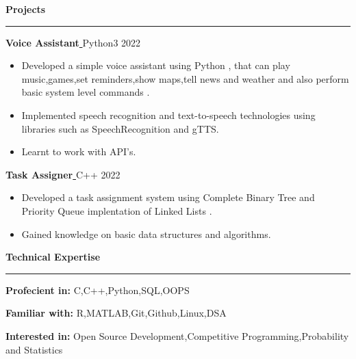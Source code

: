 \documentclass{article}
\begin{document}
\hypersetup{hidelinks,colorlinks,urlcolor=black} 
\vspace*{1cm}
\fontsize{15}{14}
\faLaptop\vspace*{0.1cm}\textbf{\Large{Projects}}\par
\rule{\linewidth}{0.5pt}
\fontsize{10}{14}
\vspace*{0.25cm}\par\textbf{Voice Assistant}\href{https://github.com/codit04/Voice-Assistant-with-python} { \faGithubSquare}{\textbar}\fontsize{3}{14}Python3 \hfill\fontsize{8}{14}2022\par
\fontsize{10}{14}
\begin{itemize} %
    \item Developed a simple voice assistant using Python , that can play music,games,set reminders,show maps,tell news and weather and also
    perform basic system level commands . 
    \item Implemented speech recognition and text-to-speech technologies using libraries such as SpeechRecognition and gTTS.
    \item Learnt to work with API's.
\end{itemize}
\vspace*{0.25cm}\par\textbf{Task Assigner}\href{https://github.com/codit04/Task-Assigner}{ \faGithubSquare}{\textbar}\fontsize{3}{14}C++ \hfill\fontsize{8}{14}2022\par
\fontsize{10}{14}
\begin{itemize}
    \item Developed a task assignment system using Complete Binary Tree and Priority Queue implentation of Linked Lists .
    \item Gained knowledge on basic data structures and algorithms.
\end{itemize}


\vspace*{.4cm}
\fontsize{15}{14}
\faCubes\vspace*{0.1cm}\textbf{\Large{Technical Expertise}}\par
\rule{\linewidth}{0.5pt}
\fontsize{10}{14}
\vspace*{0.25cm}\par\textbf{Profecient in: }C,C++,Python,SQL,OOPS
\vspace*{0.25cm}\par\textbf{Familiar with: }R,MATLAB,Git,Github,Linux,DSA
\vspace*{0.25cm}\par\textbf{Interested in: }Open Source Development,Competitive Programming,Probability and Statistics
\end{document}
